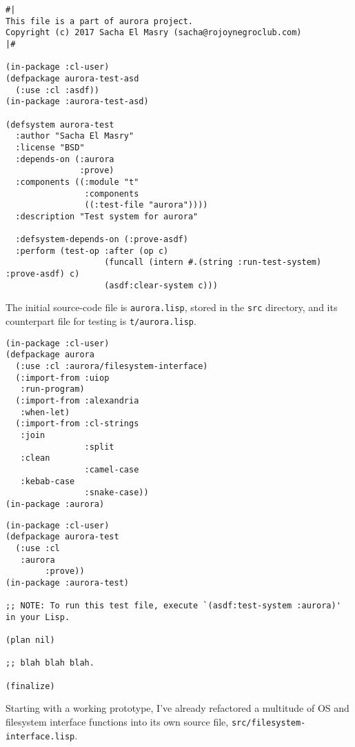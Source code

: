 \documentclass{article}
\begin{document}
\begin{verbatim}
#|
This file is a part of aurora project.
Copyright (c) 2017 Sacha El Masry (sacha@rojoynegroclub.com)
|#

(in-package :cl-user)
(defpackage aurora-test-asd
  (:use :cl :asdf))
(in-package :aurora-test-asd)

(defsystem aurora-test
  :author "Sacha El Masry"
  :license "BSD"
  :depends-on (:aurora
               :prove)
  :components ((:module "t"
                :components
                ((:test-file "aurora"))))
  :description "Test system for aurora"

  :defsystem-depends-on (:prove-asdf)
  :perform (test-op :after (op c)
                    (funcall (intern #.(string :run-test-system) :prove-asdf) c)
                    (asdf:clear-system c)))
\end{verbatim}

The initial source-code file is \texttt{aurora.lisp}, stored in the \texttt{src} directory,
and its counterpart file for testing is \texttt{t/aurora.lisp}.

\begin{verbatim}
(in-package :cl-user)
(defpackage aurora
  (:use :cl :aurora/filesystem-interface)
  (:import-from :uiop
   :run-program)
  (:import-from :alexandria
   :when-let)
  (:import-from :cl-strings
   :join
                :split
   :clean
                :camel-case
   :kebab-case
                :snake-case))
(in-package :aurora)
\end{verbatim}

\begin{verbatim}
(in-package :cl-user)
(defpackage aurora-test
  (:use :cl
   :aurora
        :prove))
(in-package :aurora-test)

;; NOTE: To run this test file, execute `(asdf:test-system :aurora)' in your Lisp.

(plan nil)

;; blah blah blah.

(finalize)
\end{verbatim}

Starting with a working prototype, I've already refactored a multitude of OS and
filesystem interface functions into its own source file,
\texttt{src/filesystem-interface.lisp}.
\end{document}
